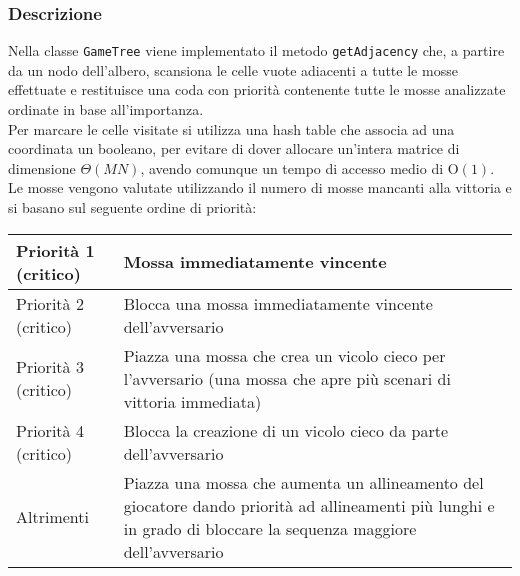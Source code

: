 \documentclass[11pt]{article}
\begin{document}
\subsubsection*{Descrizione}
Nella classe \texttt{GameTree} viene implementato il metodo \texttt{getAdjacency} che, a partire da un nodo dell'albero, scansiona le celle vuote adiacenti a tutte le mosse effettuate e restituisce una coda con priorità contenente tutte le mosse analizzate ordinate in base all'importanza.\\
Per marcare le celle visitate si utilizza una hash table che associa ad una coordinata un booleano, per evitare di dover allocare un'intera matrice di dimensione $\Theta(MN)$, avendo comunque un tempo di accesso medio di O$(1)$.\\
Le mosse vengono valutate utilizzando il numero di mosse mancanti alla vittoria e si basano sul seguente ordine di priorità:
\vspace{-0.15cm}
\begin{table}[H]	%
\centering			%
\def\arraystretch{1.5}
\begin{tabular}{|l|p{4in}|}	%
\hline	%
Priorità 1 (critico) & Mossa immediatamente vincente \\ \hline
Priorità 2 (critico) & Blocca una mossa immediatamente vincente dell'avversario \\ \hline
Priorità 3 (critico) & Piazza una mossa che crea un vicolo cieco per l'avversario (una mossa che apre più scenari di vittoria immediata) \\ \hline
Priorità 4 (critico) & Blocca la creazione di un vicolo cieco da parte dell'avversario \\ \hline
Altrimenti & Piazza una mossa che aumenta un allineamento del giocatore dando priorità ad allineamenti più lunghi e in grado di bloccare la sequenza maggiore dell'avversario \\ \hline
\end{tabular}
\end{table}
\end{document}
